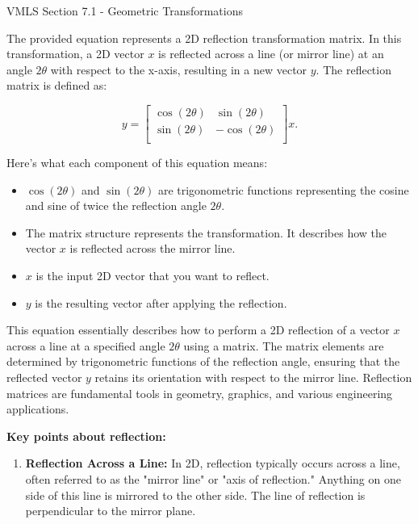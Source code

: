 \begin{notes}{VMLS Section 7.1 - Geometric Transformations}
    \begin{highlight}
        The provided equation represents a 2D reflection transformation matrix. In this transformation, a 2D vector \(x\) is reflected across a line (or mirror line) at an angle \(2\theta\) with respect 
        to the x-axis, resulting in a new vector \(y\). The reflection matrix is defined as:
        
        \begin{equation*}
            y = 
            \begin{bmatrix}
                \cos{(2\theta)} & \sin{(2\theta)} \\
                \sin{(2\theta)} & -\cos{(2\theta)} \\
            \end{bmatrix}
            x.
        \end{equation*}
        
        Here's what each component of this equation means:

        \begin{itemize}
            \item \(\cos{(2\theta)}\) and \(\sin{(2\theta)}\) are trigonometric functions representing the cosine and sine of twice the reflection angle \(2\theta\).
            \item The matrix structure represents the transformation. It describes how the vector \(x\) is reflected across the mirror line.
            \item \(x\) is the input 2D vector that you want to reflect.
            \item \(y\) is the resulting vector after applying the reflection.
        \end{itemize}
        
        This equation essentially describes how to perform a 2D reflection of a vector \(x\) across a line at a specified angle \(2\theta\) using a matrix. The matrix elements are determined by 
        trigonometric functions of the reflection angle, ensuring that the reflected vector \(y\) retains its orientation with respect to the mirror line. Reflection matrices are fundamental tools in 
        geometry, graphics, and various engineering applications.
        
    \end{highlight}
    
    \textbf{Key points about reflection:}
    
    \begin{enumerate}
        \item \textbf{Reflection Across a Line:} In 2D, reflection typically occurs across a line, often referred to as the "mirror line" or "axis of reflection." Anything on one side of this line is 
        mirrored to the other side. The line of reflection is perpendicular to the mirror plane.
    

\end{enumerate}
\end{notes}
